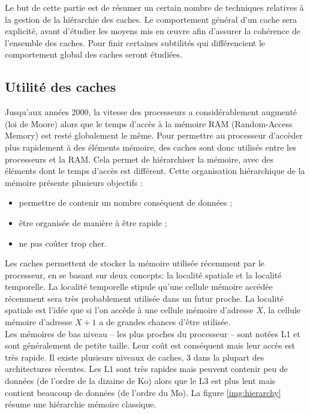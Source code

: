Le but de cette partie est de résumer un certain nombre de techniques relatives à la gestion de la hiérarchie des caches. Le comportement général d'un cache sera explicité, avant d'étudier les moyens mis en {\oe}uvre afin d'assurer la cohérence de l'ensemble des caches. Pour finir certaines subtilités qui différencient le comportement global des caches seront étudiées.

\subsection{Utilité des caches}

Jusqu'aux années 2000, la vitesse des processeurs a considérablement augmenté (loi de Moore) alors que le temps d'accès à la mémoire RAM (Random-Access Memory) est resté globalement le même. Pour permettre au processeur d'accèder plus rapidement à des éléments mémoire, des caches sont donc utilisés entre les processeurs et la RAM. Cela permet de hiérarchiser la mémoire, avec des éléments dont le temps d'accès est différent. Cette organisation hiérarchique de la mémoire présente plusieurs objectifs : \\
\begin{itemize}
\item permettre de contenir un nombre conséquent de données ;
\item être organisée de manière à être rapide ;
\item ne pas coûter trop cher.\\ 
\end{itemize}

Les caches permettent de stocker la mémoire utilisée récemment par le processeur, en se basant sur deux concepts: la localité spatiale et la localité temporelle. La localité temporelle stipule qu'une cellule mémoire accédée récemment sera très probablement utilisée dans un futur proche. La localité spatiale est l'idée que si l'on accède à une cellule mémoire d'adresse $X$, la cellule mémoire d'adresse $X+1$ a de grandes chances d'être utilisée. \\

Les mémoires de bas niveau -- les plus proches du processeur -- sont notées L1 et sont généralement de petite taille. Leur coût est conséquent mais leur accès est très rapide. Il existe plusieurs niveaux de caches, $3$ dans la plupart des architectures récentes. Les L1 sont très rapides mais peuvent contenir peu de données (de l'ordre de la dizaine de Ko) alors que le L3 est plus lent mais contient beaucoup de données (de l'ordre du Mo). La figure \ref{img:hierarchy} résume une hiérarchie mémoire classique.\\

